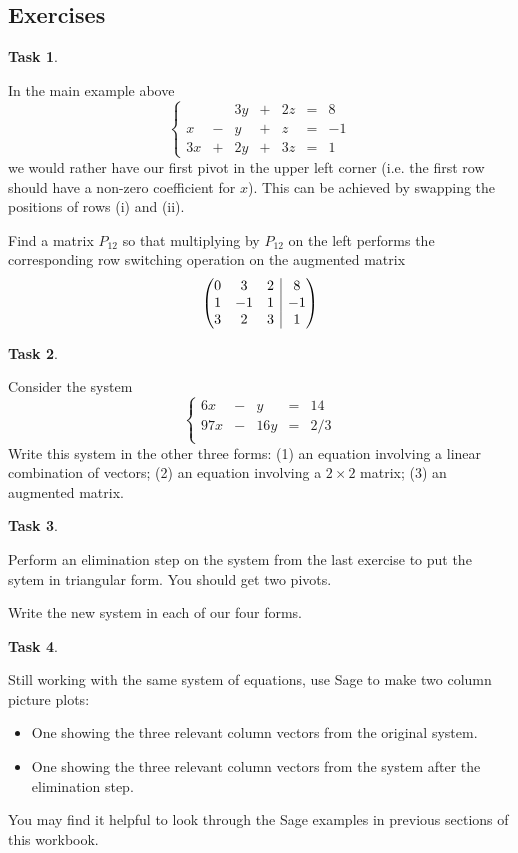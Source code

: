 \documentclass[10pt,]{book}
\makeatletter
\theoremstyle{plain}
\theoremstyle{definition}
\numberwithin{equation}{section}
\newtheorem{task}{Task}[chapter]
\newcommand{\augmatrix}[2]{\left(\begin{array}{@{}#1 |c@{}} #2 \end{array}\right)}
\makeatother
\begin{document}
\subsection[Exercises]{Exercises}\label{subsection-33}
\begin{task}
\label{task-47}

      In the main example above
      \[
      \left\{ \begin{array}{rrrrrrr}
         &  &3y &+ &2z &= &8 \\
       x &- & y &+ & z &= &-1 \\
      3x &+ &2y &+ &3z &= &1
      \end{array}
      \right.
      \]
      we would rather have our first pivot in the upper left corner (i.e. the
      first row should have a non-zero coefficient for \(x\)). This can be
      achieved by swapping the positions of rows (i) and (ii).
\par

      Find a matrix \(P_{12}\) so that multiplying by \(P_{12}\) on the left
      performs the corresponding row switching operation on the augmented matrix
      \[
      \augmatrix{ccc}{
      0 &3 &2 &8 \\ 1 &-1 &1 &-1 \\ 3 &2 &3 &1}
      \]
\end{task}
\begin{task}
\label{task-48}

      Consider the system
      \[
      \left\{ \begin{array}{rrrrr}
      6x &- &y &= &14 \\
      97x &- &16y &= &2/3 \\
      \end{array}
      \right.
      \]
      Write this system in the other three forms: (1) an equation involving a
      linear combination of vectors; (2) an equation involving a \(2\times 2\)
      matrix; (3) an augmented matrix.
\end{task}
\begin{task}
\label{task-49}

      Perform an elimination step on the system from the last exercise to put the sytem in triangular form. You should get two pivots.
\par

      Write the new system in each of our four forms.
\end{task}
\begin{task}
\label{task-50}

      Still working with the same system of equations, use Sage to make two column picture plots:
\begin{itemize}
\item{} One showing the three relevant column vectors from the original system.\item{} One showing the three relevant column vectors from the system after the elimination step.\end{itemize}
\par

      You may find it helpful to look through the Sage examples in previous sections
      of this workbook.
\end{task}
\end{document}
